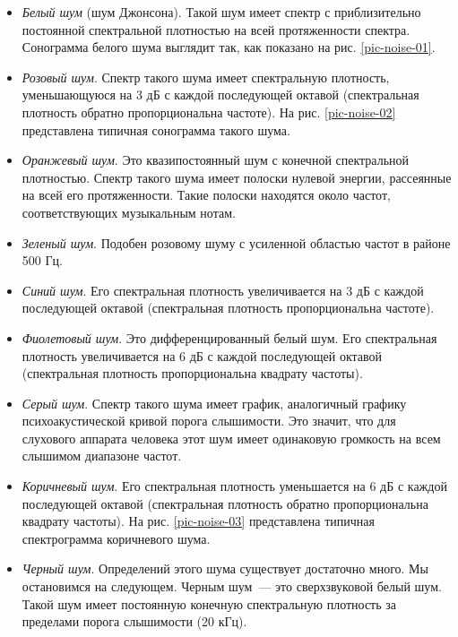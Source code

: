 \documentclass[oneside, final, 14pt]{extreport}
\begin{document}
\begin{itemize}
\item {\itshape Белый шум} (шум Джонсона). Такой шум имеет спектр с приблизительно постоянной спектральной плотностью на всей протяженности спектра. Сонограмма белого шума выглядит так, как показано на рис. \ref{pic-noise-01}.

\item {\itshape Розовый шум}. Спектр такого шума имеет спектральную плотность, уменьшающуюся на 3 дБ с каждой последующей октавой (спектральная плотность обратно пропорциональна частоте). На рис. \ref{pic-noise-02} представлена типичная сонограмма такого шума.

\item {\itshape Оранжевый шум}. Это квазипостоянный шум с конечной спектральной плотностью. Спектр такого шума имеет полоски нулевой энергии, рассеянные на
всей его протяженности. Такие полоски находятся около частот, соответствующих музыкальным нотам.

\item {\itshape Зеленый шум}. Подобен розовому шуму с усиленной областью частот в районе 500 Гц.

\item {\itshape Синий шум}. Его спектральная плотность увеличивается на 3 дБ с каждой последующей октавой (спектральная плотность пропорциональна частоте).

\item {\itshape Фиолетовый шум}. Это дифференцированный белый шум. Его спектральная
плотность увеличивается на 6 дБ с каждой последующей октавой (спектральная плотность пропорциональна квадрату частоты).

\item {\itshape Серый шум}. Спектр такого шума имеет график, аналогичный графику психоакустической кривой порога слышимости. Это значит, что для слухового
аппарата человека этот шум имеет одинаковую громкость на всем слышимом диапазоне частот.

\item {\itshape Коричневый шум}. Его спектральная плотность уменьшается на 6 дБ с каждой последующей октавой (спектральная плотность обратно пропорциональна квадрату частоты). На рис. \ref{pic-noise-03} представлена типичная спектрограмма коричневого шума.

\item {\itshape Черный шум}. Определений этого шума существует достаточно много. Мы остановимся на следующем. Черным шум~--- это сверхзвуковой белый шум. Такой шум имеет постоянную конечную спектральную плотность за пределами порога слышимости (20 кГц).
\end{itemize}
\end{document}

